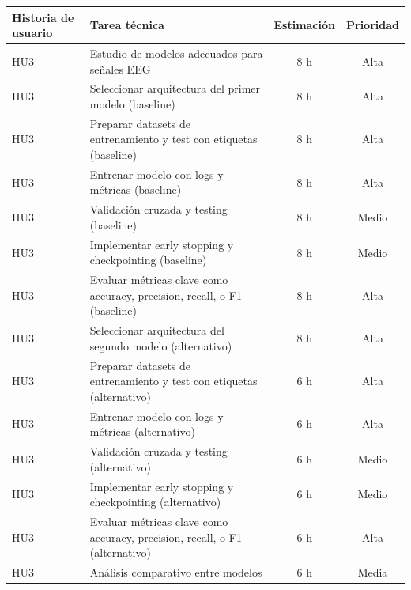 \documentclass[
11pt, %
]{charter}
\begin{document}
\begin{table}[htpb]
\begin{tabularx}{\linewidth}{@{}|X|X|c|c|@{}}
\end{tabularx}
\end{table}

\begin{table}[htpb]
\centering
\begin{tabularx}{\linewidth}{@{}|X|X|c|c|@{}}
\hline
\rowcolor[HTML]{C0C0C0}
Historia de usuario & Tarea técnica & Estimación & Prioridad \\ \hline
HU3 & Estudio de modelos adecuados para señales EEG					 & 8 h & Alta \\ \hline
HU3 & Seleccionar arquitectura del primer modelo (baseline)					 & 8 h & Alta \\ \hline
HU3 & Preparar datasets de entrenamiento y test con etiquetas (baseline)					 & 8 h & Alta \\ \hline
HU3 & Entrenar modelo con logs y métricas	 (baseline)					 & 8 h & Alta \\ \hline
HU3 & Validación cruzada y testing (baseline)			 & 8 h & Medio \\ \hline
HU3 & Implementar early stopping y checkpointing	 (baseline)			 & 8 h & Medio \\ \hline
HU3 & Evaluar métricas clave como accuracy, precision, recall, o F1 (baseline)					 & 8 h & Alta \\ \hline
HU3 & Seleccionar arquitectura del segundo modelo  (alternativo)					 & 8 h & Alta \\ \hline
HU3 & Preparar datasets de entrenamiento y test con etiquetas (alternativo)					 & 6 h & Alta \\ \hline
HU3 & Entrenar modelo con logs y métricas	 (alternativo)					 & 6 h & Alta \\ \hline
HU3 & Validación cruzada y testing (alternativo)			 & 6 h & Medio \\ \hline
HU3 & Implementar early stopping y checkpointing	 (alternativo)			 & 6 h & Medio \\ \hline
HU3 & Evaluar métricas clave como accuracy, precision, recall, o F1 (alternativo)					 & 6 h & Alta \\ \hline
HU3 & Análisis comparativo entre modelos				 & 6 h & Media \\ \hline


\end{tabularx}
\end{table}
\end{document}
